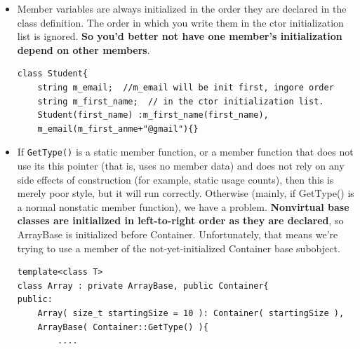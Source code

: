 \documentclass[a4paper,11pt,twoside]{book}
\begin{document}
\begin{itemize}
	\item Member variables are always initialized in the order they are declared in the class definition. The order in which you write them in the ctor initialization list is ignored.  \textbf{So you'd better not have one member's initialization depend on other members}.
	
\begin{lstlisting}[numbers=none]
class Student{
	string m_email;  //m_email will be init first, ingore order
	string m_first_name;  // in the ctor initialization list.
	Student(first_name) :m_first_name(first_name),
	m_email(m_first_anme+"@gmail"){}
\end{lstlisting}
		
		
		\item If \texttt{GetType()} is a static member function, or a member function that does not use its this pointer (that is, uses no member data) and does not rely on any side effects of construction (for example, static usage counts), then this is merely poor style, but it will run correctly. Otherwise (mainly, if GetType() is a normal nonstatic member function), we have a problem.
		\textbf{Nonvirtual base classes are initialized in left-to-right order as they are declared}, so ArrayBase is initialized before Container. Unfortunately, that means we're trying to use a member of the not-yet-initialized Container base subobject.
		
\begin{lstlisting}[numbers=none]
template<class T>
class Array : private ArrayBase, public Container{
public:
	Array( size_t startingSize = 10 ): Container( startingSize ), 
	ArrayBase( Container::GetType() ){
		....
\end{lstlisting}
		
	\end{itemize}
	
	
\end{document}
